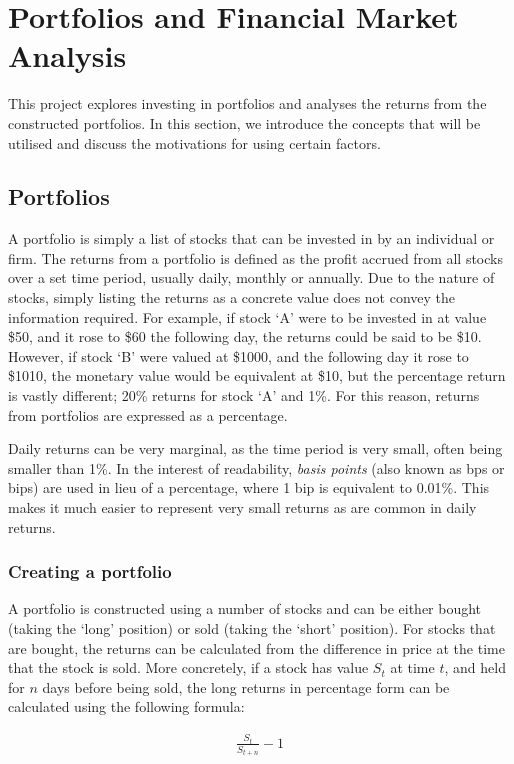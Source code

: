 \documentclass[ oneside,%
                    author={Joshua Felmeden},
                    degree={MEng},
                     title={Semantic Analysis of Financial Headlines Based on Realised Stock Returns},
                  subtitle={}]{dissertation}
\begin{document}
\section{Portfolios and Financial Market Analysis}
This project explores investing in portfolios and analyses the returns from the constructed portfolios. In this section, we introduce the concepts that will be utilised and discuss the motivations for using certain factors.

\subsection{Portfolios}
A portfolio is simply a list of stocks that can be invested in by an individual or firm. The returns from a portfolio is defined as the profit accrued from all stocks over a set time period, usually daily, monthly or annually. Due to the nature of stocks, simply listing the returns as a concrete value does not convey the information required. For example, if stock `A' were to be invested in at value \$50, and it rose to \$60 the following day, the returns could be said to be \$10. However, if stock `B' were valued at \$1000, and the following day it rose to \$1010, the monetary value would be equivalent at \$10, but the percentage return is vastly different; 20\% returns for stock `A' and 1\%. For this reason, returns from portfolios are expressed as a percentage.

Daily returns can be very marginal, as the time period is very small, often being smaller than 1\%. In the interest of readability, \textit{basis points} (also known as bps or bips) are used in lieu of a percentage, where 1 bip is equivalent to 0.01\%. This makes it much easier to represent very small returns as are common in daily returns.

\subsubsection{Creating a portfolio}
A portfolio is constructed using a number of stocks and can be either bought (taking the `long' position) or sold (taking the `short' position). For stocks that are bought, the returns can be calculated from the difference in price at the time that the stock is sold. More concretely, if a stock has value $S_{t}$ at time $t$, and held for $n$ days before being sold, the long returns in percentage form can be calculated using the following formula:

\begin{align*}
\frac{S_{t}}{S_{t+n}} - 1
\end{align*}
\end{document}
